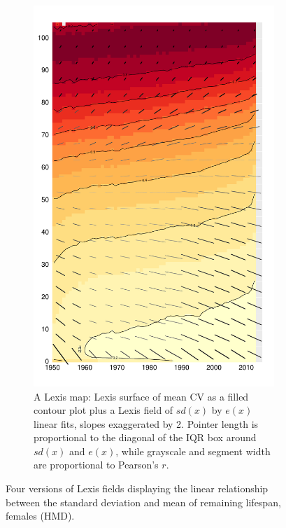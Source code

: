 \documentclass{article}
\begin{document}
\begin{figure}
\begin{subfigure}{.48\textwidth}
  \includegraphics[scale=.38]{Figures/FigApp4.pdf}
  \caption{A Lexis map: Lexis surface of mean CV as a filled contour plot plus a Lexis field of $sd(x)$ by $e(x)$ linear fits, slopes exaggerated by 2. Pointer length is proportional to the diagonal of the IQR box around $sd(x)$ and $e(x)$, while grayscale and segment width are proportional to Pearson's $r$.}
  \label{fig:sfig4}
\end{subfigure}
\caption{Four versions of Lexis fields displaying the linear
relationship between the standard deviation and mean of remaining
lifespan, females (HMD).}
\label{fig:figFields}
\end{figure}
\end{document}
